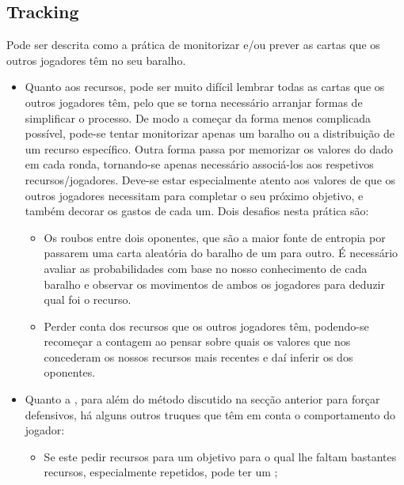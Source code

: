 \documentclass[12pt]{article}
\begin{document}
\subsection{Tracking}
Pode ser descrita como a prática de monitorizar e/ou prever as cartas que os outros jogadores têm no seu baralho.
\begin{itemize}
    \item Quanto aos recursos, pode ser muito difícil lembrar todas as cartas que os outros jogadores têm, pelo que se torna necessário arranjar formas de simplificar o processo.
    De modo a começar da forma menos complicada possível, pode-se tentar monitorizar apenas um baralho ou a distribuição de um recurso específico.
    Outra forma passa por memorizar os valores do dado em cada ronda, tornando-se apenas necessário associá-los aos respetivos recursos/jogadores.
    Deve-se estar especialmente atento aos valores de que os outros jogadores necessitam para completar o seu próximo objetivo, e também decorar os gastos de cada um.
    Dois desafios nesta prática são:
    \vspace{-0.3cm}
    \begin{itemize}[noitemsep]
        \item Os roubos entre dois oponentes, que são a maior fonte de entropia por passarem uma carta aleatória do baralho de um para outro. 
        É necessário avaliar as probabilidades com base no nosso conhecimento de cada baralho e observar os movimentos de ambos os jogadores para deduzir qual foi o recurso.
        \item Perder conta dos recursos que os outros jogadores têm, podendo-se recomeçar a contagem ao pensar sobre quais os valores que nos concederam os nossos recursos mais recentes e daí inferir os dos oponentes.
    \end{itemize}
    \item Quanto a , para além do método discutido na secção anterior para forçar  defensivos, há alguns outros truques que têm em conta o comportamento do jogador:
    \vspace{-0.8cm}
    \begin{itemize}[noitemsep]
        \item Se este pedir recursos para um objetivo para o qual lhe faltam bastantes recursos, especialmente repetidos, pode ter um ;

\end{itemize}
\end{itemize}
\end{document}

